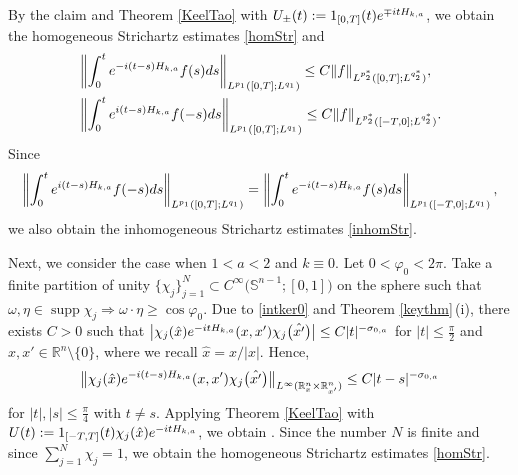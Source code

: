 \documentclass[10pt,a4paper]{article}
\numberwithin{equation}{section}
\def\R{\mathbb{R}}%
\DeclareMathOperator{\supp}{supp}%
\def\f{\varphi}
\def\s{\sigma}
\def\y{\eta}
\begin{document}
By the claim and Theorem \ref{KeelTao} with $U_{\pm}(t):=1_{[0,T]}(t){\rm e}^{\mp {\rm i}tH_{k,a}}$, we obtain the homogeneous Strichartz estimates \eqref{homStr} and
\begin{align*}
&\left\|\int_{0}^t{\rm e}^{-{\rm i}(t-s)H_{k,a}}f(s){\rm d}s \right\|_{L^{p_1}([0,T]; L^{q_1})} \leq C\|f\|_{L^{p_2^*}([0,T]; L^{q_2^*})},\\
&\left\|\int_{0}^t{\rm e}^{{\rm i}(t-s)H_{k,a}}f(-s){\rm d}s \right\|_{L^{p_1}([0,T]; L^{q_1})} \leq C\|f\|_{L^{p_2^*}([-T,0]; L^{q_2^*})}.
\end{align*}
Since
\[
\left\|\int_{0}^t{\rm e}^{{\rm i}(t-s)H_{k,a}}f(-s){\rm d}s \right\|_{L^{p_1}([0,T]; L^{q_1})}=\left\|\int_{0}^t{\rm e}^{-{\rm i}(t-s)H_{k,a}}f(s){\rm d}s \right\|_{L^{p_1}([-T,0]; L^{q_1})},
\] we also obtain the inhomogeneous Strichartz estimates \eqref{inhomStr}.






Next, we consider the case when $1<a<2$ and $k\equiv 0$. Let $0<\f_0<2\pi$.
Take a finite partition of unity $\{\chi_j\}_{j=1}^N\subset C^{\infty}\bigl(\mathbb{S}^{n-1};[0,1]\bigr)$ on the sphere such that
$
\omega,\y\in \supp \chi_j\Rightarrow \omega\cdot \y\geq \cos\f_0$.
Due to \eqref{intker0} and Theorem \ref{keythm}\,(i), there exists $C>0$ such that $\big|\chi_j(\hat{x}){\rm e}^{- {\rm i}tH_{k,a}}(x,x')\chi_j\bigl(\hat{x'}\bigr)\big|\leq C|t|^{-\s_{0,a}}$ for $|t|\leq \frac{\pi}{2}$ and $x,x'\in \R^n\setminus \{0\}$, where we recall $\hat{x}=x/|x|$. Hence,
\begin{align*}
\big\|\chi_j(\hat{x}){\rm e}^{- {\rm i}(t-s)H_{k,a}}(x,x')\chi_j\bigl(\hat{x'}\bigr)\big\|_{L^{\infty}(\R^n_x\times \R^n_{x'})}\leq C|t-s|^{-\s_{0,a}}
\end{align*}
for $|t|, |s|\leq \frac{\pi}{4}$ with $t\neq s$.
Applying Theorem \ref{KeelTao} with $U(t):=1_{[-T,T]}(t)\chi_j(\hat{x}){\rm e}^{- {\rm i}tH_{k,a}}$, we obtain
.
Since the number $N$ is finite and since $\sum_{j=1}^N\chi_j=1$, we obtain the homogeneous Strichartz estimates \eqref{homStr}.
\end{document}
